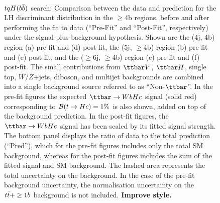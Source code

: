 \begin{figure}[htbp]
\begin{center}
 \\
\caption{\small{$tqH(b\bar{b})$ search: Comparison between the data and prediction for the LH discriminant distribution in the $\geq$4b regions,
before and after performing the fit to data  (``Pre-Fit'' and ``Post-Fit'', respectively) under the signal-plus-background hypothesis.
Shown are the (4j, 4b) region (a) pre-fit and (d) post-fit,  the (5j, $\geq$4b) region (b) pre-fit and (e) post-fit, and
the ($\geq$6j, $\geq$4b) region (c) pre-fit and (f) post-fit.
The small contributions from $\ttbar V$, $\ttbar H$, single top, $W/Z$+jets, diboson, and multijet backgrounds are combined into a single background source 
referred to as ``Non-$\ttbar$''. 
In the pre-fit figures the expected $\Hc$ signal (solid red) corresponding to $\mathcal{B}(t\to Hc)=1\%$ is also shown,
added on top of the background prediction. In the post-fit figures, the $\Hc$ signal has been scaled by its fitted signal strength.
The bottom panel displays the ratio of data to the total prediction (``Pred''), which for the pre-fit figures includes only the total SM background,
whereas for the post-fit figures includes the sum of the fitted signal and SM background.
The hashed area represents the total uncertainty on the background.
In the case of the pre-fit background uncertainty, the normalisation uncertainty on the $t\bar{t}+\geq1b$ background is not included. \textbf{Improve style.}}}
\label{fig:prepostfit_unblinded_WbHc_4btagin}
\end{center}
\end{figure}

